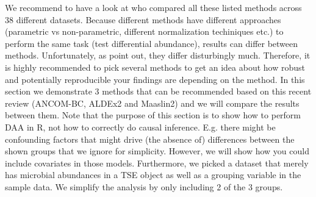 \documentclass[
]{book}
\newenvironment{Shaded}{\begin{snugshade}}{\end{snugshade}}
\newcommand{\CommentTok}[1]{\textcolor[rgb]{0.56,0.35,0.01}{\textit{#1}}}
\newcommand{\FunctionTok}[1]{\textcolor[rgb]{0.00,0.00,0.00}{#1}}
\newcommand{\NormalTok}[1]{#1}
\newcommand{\OtherTok}[1]{\textcolor[rgb]{0.56,0.35,0.01}{#1}}
\newcommand{\SpecialCharTok}[1]{\textcolor[rgb]{0.00,0.00,0.00}{#1}}
\newcommand{\StringTok}[1]{\textcolor[rgb]{0.31,0.60,0.02}{#1}}
\begin{document}
We recommend to have a look at \citet{nearingMicrobiomeDifferentialAbundance2021} who compared all these listed methods across 38
different datasets. Because different methods have different approaches
(parametric vs non-parametric, different normalization techiniques etc.) to
perform the same task (test differential abundance), results can differ between
methods. Unfortunately, as \citet{nearingMicrobiomeDifferentialAbundance2021} point out, they differ disturbingly
much. Therefore, it is highly recommended to pick several methods to get an
idea about how robust and potentially reproducible your findings are depending
on the method. In this section we demonstrate 3 methods that can be recommended
based on this recent review (ANCOM-BC, ALDEx2 and Maaslin2) and we will compare
the results between them.
Note that the purpose of this section is to show how to perform DAA in R, not
how to correctly do causal inference. E.g. there might be confounding factors
that might drive (the absence of) differences between the shown groups that we
ignore for simplicity. However, we will show how you could include covariates
in those models. Furthermore, we picked a dataset that merely has
microbial abundances in a TSE object as well as a grouping variable in the
sample data. We simplify the analysis by only including 2 of the 3 groups.

\begin{Shaded}
\end{Shaded}
\end{document}
